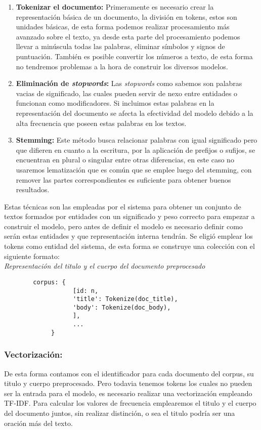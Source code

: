 \documentclass[runningheads,a4paper]{llncs}
\begin{document}
\begin{enumerate}
	\item \textbf{Tokenizar el documento:} Primeramente es necesario crear la representación básica de un documento, la división en tokens, estos son unidades básicas, de esta forma podemos realizar procesamiento más avanzado sobre el texto, ya desde esta parte del procesamiento podemos llevar a minúscula todas las palabras, eliminar símbolos y signos de puntuación. También es posible convertir los números a texto, de esta forma no tendremos problemas a la hora de construir los diversos modelos. \\
	\item \textbf{Eliminación de \textit{stopwords}:} Las \textit{stopwords} como sabemos son palabras vacias de significado, las cuales pueden servir de nexo entre entidades o funcionan como modificadores. Si incluimos estas palabras en la representación del documento se afecta la efectividad del modelo debido a la alta frecuencia que poseen estas palabras en los textos. \\
	\item \textbf{Stemming:} Este método busca relacionar palabras con igual significado
	pero que difieren en cuanto a la escritura, por la aplicación de prefijos o
	sufijos, se encuentran en plural o singular entre otras diferencias, en este caso no usaremos lematización que es común que se emplee luego del stemming, con remover las partes correspondientes es suficiente para obtener buenos resultados.
\end{enumerate} 

Estas técnicas son las empleadas por el sistema para obtener un conjunto de textos formados por entidades con un significado y peso correcto para empezar a construir el modelo, pero antes de definir el modelo es necesario definir como serán estas entidades y que representación interna tendrán. Se eligió emplear los tokens como entidad del sistema, de esta forma se construye una colección con el siguiente formato:  \\

\noindent
{\it Representación del titulo y el cuerpo del documento preprocesado}
\begin{verbatim}
	    corpus: {
                   [id: n,
                   'title': Tokenize(doc_title),
                   'body': Tokenize(doc_body),
                   ],
                   ...
             }
\end{verbatim}
%
\noindent

\subsubsection{Vectorización:} De esta forma contamos con el identificador para cada documento del corpus, su titulo y cuerpo preprocesado. Pero todavia tenemos tokens los cuales no pueden ser la entrada para el modelo, es necesario realizar una vectorización
empleando TF-IDF. Para calcular los valores de frecuencia emplearemos el titulo y el cuerpo del documento juntos, sin realizar distinción, o sea el titulo podría ser una oración más del texto.
\end{document}
